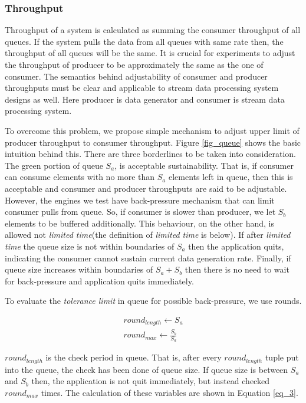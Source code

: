 \documentclass{vldb}
\begin{document}
\subsubsection{Throughput}
Throughput of a system is calculated as summing the consumer throughput of all queues.  If the system pulls the data from all queues with same rate then, the throughput of all queues will be the same. It is crucial for experiments to adjust the throughput of producer to be approximately the same as the one of consumer. The semantics behind adjustability of consumer and producer throughputs must be clear and applicable to stream data processing system designs as well. Here producer is data generator and consumer is stream data processing system. 

To overcome this problem, we propose simple mechanism to adjust upper limit of producer throughput  to consumer throughput. Figure \ref{fig_queue} shows the basic intuition behind this. There are three borderlines to be taken into consideration. The green portion of queue $S_{a}$,  is acceptable sustainability. That is, if consumer can consume elements with no more than $S_{a}$ elements left in queue, then this is acceptable and consumer and producer throughputs are said to be adjustable. However, the engines we test have back-pressure mechanism that can limit consumer pulls from queue. So, if consumer is slower than producer, we let $S_{b}$ elements to be buffered additionally. This behaviour, on the other hand, is allowed not \textit{limited time}(the definition of \textit{limited time} is below). If after \textit{limited time} the queue size is not within boundaries of $S_{a}$ then the application quits, indicating the consumer cannot sustain current data generation rate. Finally, if queue size increases within boundaries of $S_{a} + S_{b}$ then there is no need to wait for back-pressure and application quits immediately. 

To evaluate the \textit{tolerance limit} in queue for possible back-pressure, we use rounds. 

\begin{equation}
  \begin{gathered}
round_{length} \gets S_{a} \\
round_{max} \gets \frac{S_{b}}{S_{a}}
 \end{gathered}\label{eq_3}
\end{equation}

$round_{length}$ is the check period in queue. That is, after every $round_{length}$ tuple put into the queue, the check has been done of queue size. If queue size is between $S_{a}$ and $S_{b}$ then, the application is not quit immediately, but instead checked $round_{max}$ times. The calculation of these variables are shown in Equation \ref{eq_3}.
\end{document}
